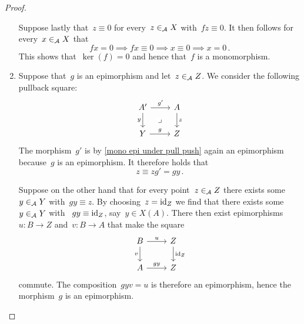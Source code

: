 \begin{proof}
\begin{enumerate}
      Suppose lastly that~$z \equiv 0$ for every~$z \in_{\mathcal{A}} X$ with~$fz \equiv 0$.
      It then follows for every~$x \in_{\mathcal{A}} X$ that
      \[
                  fx = 0
        \implies  fx \equiv 0
        \implies  x \equiv 0
        \implies  x = 0 \,.
      \]
      This shows that~$\ker(f) = 0$ and hence that~$f$ is a monomorphism.
    \item
      Suppose that~$g$ is an epimorphism and let~$z \in_{\mathcal{A}} Z$.
      We consider the following pullback square:
      \[
        \begin{tikzcd}
            A'
            \arrow{r}[above]{g'}
            \arrow{d}[left]{y}
            \arrow[phantom]{dr}[description]{\pb}
          & A
            \arrow{d}[right]{z}
          \\
            Y
            \arrow{r}[above]{g}
          & Z
        \end{tikzcd}
      \]
      The morphism~$g'$ is by \cref{mono epi under pull push} again an epimorphism because~$g$ is an epimorphism.
      It therefore holds that
      \[
                z
        \equiv  z g'
        =       g y \,.
      \]
      
      Suppose on the other hand that for every point~$z \in_{\mathcal{A}} Z$ there exists some~$y \in_{\mathcal{A}} Y$ with~$gy \equiv z$.
      By choosing~$z = \operatorname{id}_Z$ we find that there exists some~$y \in_{\mathcal{A}} Y$ with ~$gy \equiv \operatorname{id}_Z$, say~$y \in X(A)$.
      There then exist epimorphisms~$u \colon B \to Z$ and~$v \colon B \to A$ that make the square
      \[
        \begin{tikzcd}
            B
            \arrow{r}[above]{u}
            \arrow{d}[left]{v}
          & Z
            \arrow{d}[right]{\id_Z}
          \\
            A
            \arrow{r}[above]{gy}
          & Z
        \end{tikzcd}
      \]
      commute.
      The composition~$gyv = u$ is therefore an epimorphism, hence the morphism~$g$ is an epimorphism.
  \end{enumerate}
  
  
  
  
  
  
  
  
  
  

\end{proof}
